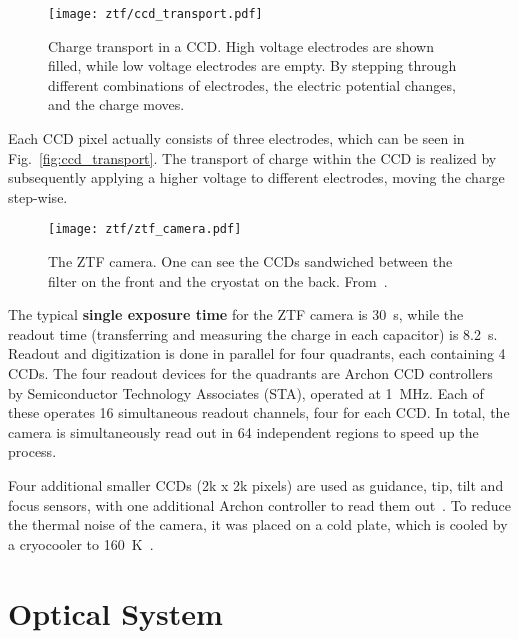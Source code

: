 \begin{figure}[htb]
    \texttt{[image: ztf/ccd\_transport.pdf]}
    \caption[Charge transport in a CCD]{Charge transport in a CCD. High voltage electrodes are shown filled, while low voltage electrodes are empty. By stepping through different combinations of electrodes, the electric potential changes, and the charge moves.}
\end{figure}

Each CCD pixel actually consists of three electrodes, which can be seen in Fig.~\ref{fig:ccd_transport}. The transport of charge within the CCD is realized by subsequently applying a higher voltage to different electrodes, moving the charge step-wise.

\begin{figure}[htb]
    \texttt{[image: ztf/ztf\_camera.pdf]}
    \caption[ZTF camera]{The ZTF camera. One can see the CCDs sandwiched between the filter on the front and the cryostat on the back. From~\cite{Bellm2019}.}
\end{figure}

The typical \textbf{single exposure time} for the ZTF camera is \SI{30}{\second}, while the readout time (transferring and measuring the charge in each capacitor) is \SI{8.2}{\second}. Readout and digitization is done in parallel for four quadrants, each containing 4 CCDs. The four readout devices for the quadrants are Archon CCD controllers by Semiconductor Technology Associates (STA), operated at \SI{1}{\mega\Hz}. Each of these operates 16 simultaneous readout channels, four for each CCD. In total, the camera is simultaneously read out in 64 independent regions to speed up the process.

Four additional smaller CCDs (2k x 2k pixels) are used as guidance, tip, tilt and focus sensors, with one additional Archon controller to read them out~. To reduce the thermal noise of the camera, it was placed on a cold plate, which is cooled by a cryocooler to \SI{160}{\kelvin}~\cite{Dekany2016}.

\section{Optical System} 

